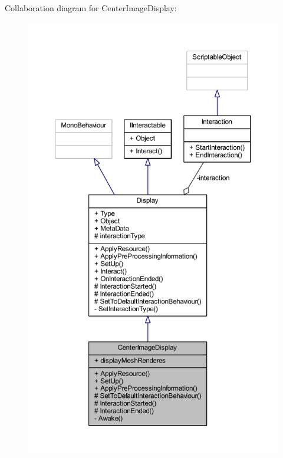 Collaboration diagram for Center\+Image\+Display\+:
\nopagebreak
\begin{figure}[H]
\begin{center}
\leavevmode
\includegraphics[height=550pt]{class_center_image_display__coll__graph}
\end{center}
\end{figure}
